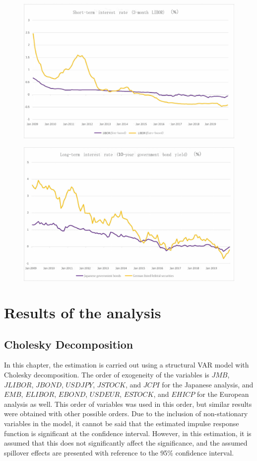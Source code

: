 \documentclass[12pt]{article}
\begin{document}
\newpage
\begin{figure}[!htbp]
    \centering
    \includegraphics[width=16cm]{libor09.pdf}
\end{figure}
\begin{figure}[!htbp]
    \centering
    \includegraphics[width=16cm]{bond09.pdf}
\end{figure}
\newpage

\section{Results of the analysis}

\subsection{Cholesky Decomposition}

In this chapter, the estimation is carried out using a structural VAR model with Cholesky decomposition.
The order of exogeneity of the variables is $JMB$, $JLIBOR$, $JBOND$, $USDJPY$, $JSTOCK$, and $JCPI$ for the Japanese analysis, and $EMB$, $ELIBOR$, $EBOND$, $USDEUR$, $ESTOCK$, and $EHICP$ for the European analysis as well.
This order of variables was used in this order, but similar results were obtained with other possible orders.
Due to the inclusion of non-stationary variables in the model, it cannot be said that the estimated impulse response function is significant at the confidence interval.
However, in this estimation, it is assumed that this does not significantly affect the significance, and the assumed spillover effects are presented with reference to the 95\% confidence interval.
\end{document}
